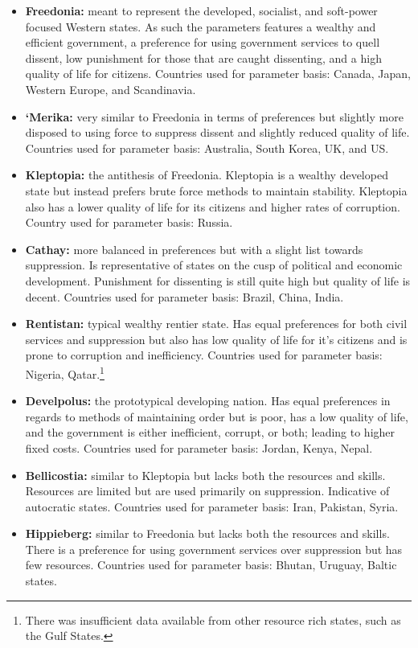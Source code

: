 \documentclass[12pt]{article}
\begin{document}
\begin{spacing}{1.5}
\begin{itemize}
	\item \textbf{Freedonia:} meant to represent the developed, socialist, and soft-power focused Western states. As such the parameters features a wealthy and efficient government, a preference for using government services to quell dissent, low punishment for those that are caught dissenting, and a high quality of life for citizens. Countries used for parameter basis: Canada, Japan, Western Europe, and Scandinavia. 
	\item \textbf{`Merika:} very similar to Freedonia in terms of preferences but slightly more disposed to using force to suppress dissent and slightly reduced quality of life. Countries used for parameter basis: Australia, South Korea, UK, and US. 
	\item \textbf{Kleptopia:} the antithesis of Freedonia. Kleptopia is a wealthy developed state but instead prefers brute force methods to maintain stability. Kleptopia also has a lower quality of life for its citizens and higher rates of corruption. Country used for parameter basis: Russia.  
	\item \textbf{Cathay:} more balanced in preferences but with a slight list towards suppression. Is representative of states on the cusp of political and economic development. Punishment for dissenting is still quite high but quality of life is decent. Countries used for parameter basis: Brazil, China, India.   
	\item \textbf{Rentistan:} typical wealthy rentier state. Has equal preferences for both civil services and suppression but also has low quality of life for it's citizens and is prone to corruption and inefficiency. Countries used for parameter basis: Nigeria, Qatar.\footnote{There was insufficient data available from other resource rich states, such as the Gulf States.} 
	\item \textbf{Develpolus:} the prototypical developing nation. Has equal preferences in regards to methods of maintaining order but is poor, has a low quality of life, and the government is either inefficient, corrupt, or both; leading to higher fixed costs. Countries used for parameter basis: Jordan, Kenya, Nepal.  	
	\item \textbf{Bellicostia:} similar to Kleptopia but lacks both the resources and skills. Resources are limited but are used primarily on suppression. Indicative of autocratic states.  Countries used for parameter basis: Iran, Pakistan, Syria. 
	\item \textbf{Hippieberg:} similar to Freedonia but lacks both the resources and skills. There is a preference for using government services over suppression but has few resources. Countries used for parameter basis: Bhutan, Uruguay, Baltic states.  
\end{itemize}


\end{spacing}
\end{document}
